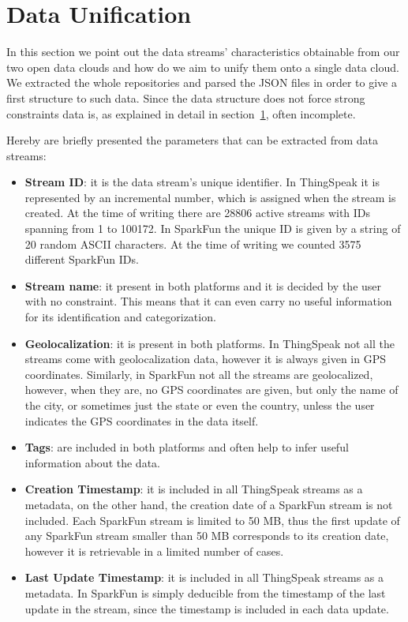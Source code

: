 \section{Data Unification}
\label{unification}
In this section we point out the data streams' characteristics obtainable from our two open data clouds and how do we aim to unify them onto a single data cloud.
We extracted the whole repositories and parsed the JSON files in order to give a first structure to such data.
Since the data structure does not force strong constraints data is, as explained in detail in section~\ref{unification}, often incomplete.

Hereby are briefly presented the parameters that can be extracted from data streams:
\begin{itemize}
 \item \textbf{Stream ID}: it is the data stream's unique identifier. In ThingSpeak it is represented by an incremental number, which is assigned when the stream is created. At the time of writing there are 28806 active streams with IDs spanning from 1 to 100172. In SparkFun the unique ID is given by a string of 20 random ASCII characters. At the time of writing we counted 3575 different SparkFun IDs. 
 \item \textbf{Stream name}: it present in both platforms and it is decided by the user with no constraint. This means that it can even carry no useful information for its identification and categorization.
 \item \textbf{Geolocalization}: it is present in both platforms. In ThingSpeak not all the streams come with geolocalization data, however it is always given in GPS coordinates. Similarly, in SparkFun not all the streams are geolocalized, however, when they are, no GPS coordinates are given, but only the name of the city, or sometimes just the state or even the country, unless the user indicates the GPS coordinates in the data itself.
 \item \textbf{Tags}: are included in both platforms and often help to infer useful information about the data.
 \item \textbf{Creation Timestamp}: it is included in all ThingSpeak streams as a metadata, on the other hand, the creation date of a SparkFun stream is not included. Each SparkFun stream is limited to 50 MB, thus the first update of any SparkFun stream smaller than 50 MB corresponds to its creation date,  however it is retrievable in a limited number of cases.
 \item \textbf{Last Update Timestamp}: it is included in all ThingSpeak streams as a metadata. In SparkFun is simply deducible from the timestamp of the last update in the stream, since the timestamp is included in each data update.

\end{itemize}
